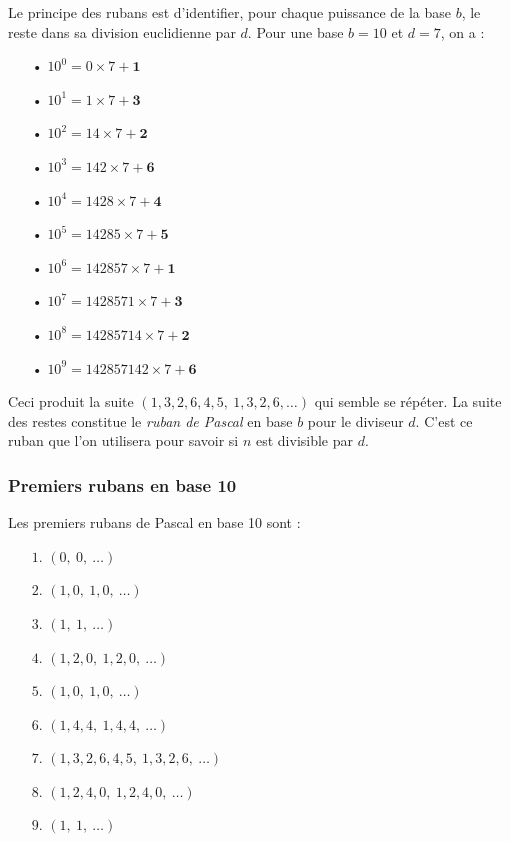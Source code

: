 \documentclass[a4paper]{article}
\begin{document}
	Le principe des rubans est d'identifier, pour chaque puissance de la base $b$, le reste dans sa division euclidienne par $d$. Pour une base $b = 10$ et $d = 7$, on a :\\
	
\vspace{-3 mm}

\begin{itemize}

	\item[•] $10^0 = 0 \times 7 + \mathbf{1}$
	\item[•] $10^1 = 1 \times 7 + \mathbf{3}$
	\item[•] $10^2 = 14 \times 7 + \mathbf{2}$
	\item[•] $10^3 = 142 \times 7 + \mathbf{6}$
	\item[•] $10^4 = {1428} \times 7 + \mathbf{4}$
	\item[•] $10^5 = {14285} \times 7 + \mathbf{5}$
	\item[•] $10^6 = {142857} \times 7 + \mathbf{1}$
	\item[•] $10^7 = {1428571} \times 7 + \mathbf{3}$
	\item[•] $10^8 = {14285714} \times 7 + \mathbf{2}$
	\item[•] $10^9 = {142857142} \times 7 + \mathbf{6}$
    
\end{itemize}

\vspace{1 mm}

	Ceci produit la suite $(1,3,2,6,4,5,~1,3,2,6,\dots)$ qui semble se répéter. La suite des restes constitue le \textit{ruban de Pascal} en base $b$ pour le diviseur $d$. C'est ce ruban que l'on utilisera pour savoir si $n$ est divisible par $d$. 

\vfill



\subsubsection*{Premiers rubans en base 10}\label{ruban_base_10}

Les premiers rubans de Pascal en base 10 sont :

\begin{itemize}

	\item[$1.$] $(0,~0,~\dots)$ 
    \item[$2.$] $(1, 0,~1, 0,~\dots)$ 
    \item[$3.$] $(1,~1,~\dots)$ 
    \item[$4.$] $(1, 2, 0,~1, 2, 0,~\dots)$ 
    \item[$5.$] $(1, 0,~1, 0,~\dots)$ 
    \item[$6.$] $(1, 4, 4,~1, 4, 4,~\dots)$ 
    \item[$7.$] $(1, 3, 2, 6, 4, 5,~1, 3, 2, 6,~\dots)$ 
    \item[$8.$] $(1, 2, 4, 0,~1, 2, 4, 0,~\dots)$ 
    \item[$9.$] $(1,~1,~\dots)$ 
    
\end{itemize}
\end{document}
